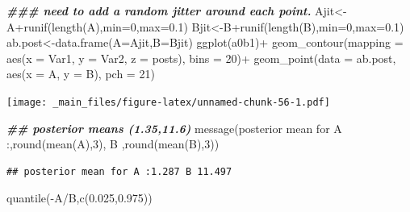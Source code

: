 \documentclass[
]{book}
\newenvironment{Shaded}{\begin{snugshade}}{\end{snugshade}}
\newcommand{\AttributeTok}[1]{\textcolor[rgb]{0.77,0.63,0.00}{#1}}
\newcommand{\DecValTok}[1]{\textcolor[rgb]{0.00,0.00,0.81}{#1}}
\newcommand{\DocumentationTok}[1]{\textcolor[rgb]{0.56,0.35,0.01}{\textbf{\textit{#1}}}}
\newcommand{\FloatTok}[1]{\textcolor[rgb]{0.00,0.00,0.81}{#1}}
\newcommand{\FunctionTok}[1]{\textcolor[rgb]{0.00,0.00,0.00}{#1}}
\newcommand{\NormalTok}[1]{#1}
\newcommand{\OtherTok}[1]{\textcolor[rgb]{0.56,0.35,0.01}{#1}}
\newcommand{\SpecialCharTok}[1]{\textcolor[rgb]{0.00,0.00,0.00}{#1}}
\newcommand{\StringTok}[1]{\textcolor[rgb]{0.31,0.60,0.02}{#1}}
\theoremstyle{definition}
\theoremstyle{definition}
\theoremstyle{definition}
\theoremstyle{definition}
\theoremstyle{remark}
\begin{document}
\begin{Shaded}
\begin{Highlighting}[]
    \DocumentationTok{\#\#\# need to add a random jitter around each point.}
\NormalTok{    Ajit}\OtherTok{\textless{}{-}}\NormalTok{A}\SpecialCharTok{+}\FunctionTok{runif}\NormalTok{(}\FunctionTok{length}\NormalTok{(A),}\AttributeTok{min=}\DecValTok{0}\NormalTok{,}\AttributeTok{max=}\FloatTok{0.1}\NormalTok{)}
\NormalTok{    Bjit}\OtherTok{\textless{}{-}}\NormalTok{B}\SpecialCharTok{+}\FunctionTok{runif}\NormalTok{(}\FunctionTok{length}\NormalTok{(B),}\AttributeTok{min=}\DecValTok{0}\NormalTok{,}\AttributeTok{max=}\FloatTok{0.1}\NormalTok{)}
\NormalTok{   ab.post}\OtherTok{\textless{}{-}}\FunctionTok{data.frame}\NormalTok{(}\AttributeTok{A=}\NormalTok{Ajit,}\AttributeTok{B=}\NormalTok{Bjit)}
 \FunctionTok{ggplot}\NormalTok{(a0b1)}\SpecialCharTok{+}
 \FunctionTok{geom\_contour}\NormalTok{(}\AttributeTok{mapping =} \FunctionTok{aes}\NormalTok{(}\AttributeTok{x =}\NormalTok{ Var1, }\AttributeTok{y =}\NormalTok{ Var2, }\AttributeTok{z =}\NormalTok{ posts), }\AttributeTok{bins =} \DecValTok{20}\NormalTok{)}\SpecialCharTok{+}
  \FunctionTok{geom\_point}\NormalTok{(}\AttributeTok{data =}\NormalTok{ ab.post, }\FunctionTok{aes}\NormalTok{(}\AttributeTok{x =}\NormalTok{ A, }\AttributeTok{y =}\NormalTok{ B), }\AttributeTok{pch =} \DecValTok{21}\NormalTok{)}
\end{Highlighting}
\end{Shaded}

\texttt{[image: \_main\_files/figure-latex/unnamed-chunk-56-1.pdf]}

\begin{Shaded}
\begin{Highlighting}[]
 \DocumentationTok{\#\# posterior means (1.35,11.6)}
 \FunctionTok{message}\NormalTok{(}\StringTok{\textquotesingle{}posterior mean for A :\textquotesingle{}}\NormalTok{,}\FunctionTok{round}\NormalTok{(}\FunctionTok{mean}\NormalTok{(A),}\DecValTok{3}\NormalTok{),}\StringTok{\textquotesingle{} B \textquotesingle{}}\NormalTok{,}\FunctionTok{round}\NormalTok{(}\FunctionTok{mean}\NormalTok{(B),}\DecValTok{3}\NormalTok{))}
\end{Highlighting}
\end{Shaded}

\begin{verbatim}
## posterior mean for A :1.287 B 11.497
\end{verbatim}

\begin{Shaded}
\begin{Highlighting}[]
 \FunctionTok{quantile}\NormalTok{(}\SpecialCharTok{{-}}\NormalTok{A}\SpecialCharTok{/}\NormalTok{B,}\FunctionTok{c}\NormalTok{(}\FloatTok{0.025}\NormalTok{,}\FloatTok{0.975}\NormalTok{))}
\end{Highlighting}
\end{Shaded}
\end{document}
